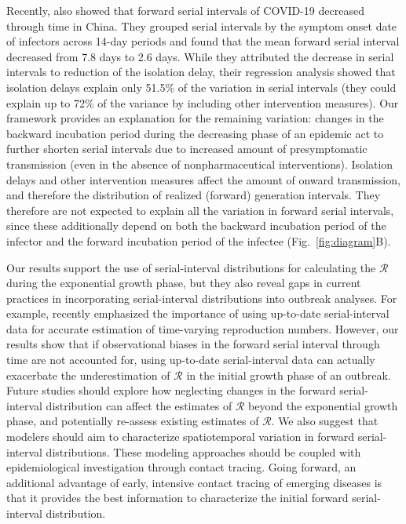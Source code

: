 \documentclass[12pt]{article}
\newcommand{\fref}[1]{Fig.~\ref{fig:#1}}
\newcommand{\RR}{\ensuremath{{\mathcal R}}\xspace}
\begin{document}
Recently, \cite{ali2020serial} also showed that forward serial intervals of COVID-19 decreased through time in China. They grouped serial intervals by the symptom onset date of infectors across 14-day periods and found that the mean forward serial interval decreased from 7.8 days to 2.6 days.
While they attributed the decrease in serial intervals to reduction of the isolation delay, their regression analysis showed that isolation delays explain only 51.5\% of the variation in serial intervals (they could explain up to 72\% of the variance by including other intervention measures).
Our framework provides an explanation for the remaining variation: changes in the backward incubation period during the decreasing phase of an epidemic act to further shorten serial intervals due to increased amount of presymptomatic transmission (even in the absence of nonpharmaceutical interventions).
Isolation delays and other intervention measures affect the amount of onward transmission, and therefore the distribution of realized (forward) generation intervals.
They therefore are not expected to explain all the variation in forward serial intervals, since these additionally depend on both the backward incubation period of the infector and the forward incubation period of the infectee (\fref{diagram}B).

Our results support the use of serial-interval distributions for calculating the \RR during the exponential growth phase,  
but they also reveal gaps in current practices in incorporating serial-interval distributions into outbreak analyses.
For example, \cite{thompson2019improved} recently emphasized the importance of using up-to-date serial-interval data for accurate estimation of time-varying reproduction numbers.
However, our results show that if observational biases in the forward serial interval through time are not accounted for, using up-to-date serial-interval data can actually exacerbate the underestimation of \RR in the initial growth phase of an outbreak.
Future studies should explore how neglecting changes in the forward serial-interval distribution can affect the estimates of \RR beyond the exponential growth phase, and potentially re-assess existing estimates of \RR.
We also suggest that modelers should aim to characterize spatiotemporal variation in forward serial-interval distributions.
These modeling approaches should be coupled with epidemiological investigation through contact tracing. 
Going forward, an additional advantage of early, intensive contact tracing of emerging diseases is that it provides the best information to characterize the initial forward serial-interval distribution.
\end{document}
